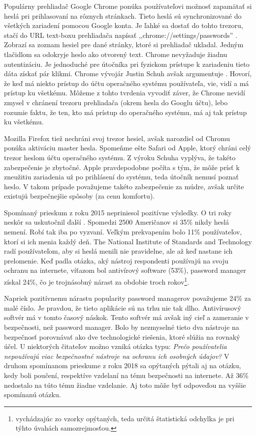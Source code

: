 Populárny prehliadač Google Chrome ponúka používateľovi možnosť zapamätať si heslá pri prihlasovaní na rôznych stránkach. Tieto heslá sú synchronizované do všetkých zariadení pomocou Google konta. Je ľahké sa dostať do tohto trezoru, stačí do URL text-boxu prehliadača napísať ,,chrome://settings/passwords'' \cite{chrome_passw}. Zobrazí sa zoznam hesiel pre dané stránky, ktoré si prehliadač ukladal. Jedným tlačidlom sa odokryje heslo ako otvorený text. Chrome nevyžaduje žiadnu autentizáciu. Je jednoduché pre útočníka pri fyzickom prístupe k zariadeniu tieto dáta získať pár klikmi. Chrome vývojár Justin Schuh avšak argumentuje \cite{chrome_passw}. Hovorí, že keď má niekto prístup do účtu operačného systému používateľa, vie, vidí a má prístup ku všetkému. Môžeme z tohto tvrdenia vyvodiť záver, že Chrome nevidí zmysel v chránení trezoru prehliadača (okrem hesla do Googlu účtu), lebo rozumie faktu, že ten, kto má prístup do operačného systému, má aj tak prístup ku všetkému.

Mozilla Firefox tiež nechráni svoj trezor hesiel, avšak narozdiel od Chromu ponúka aktiváciu master hesla. Spomeňme ešte Safari od Apple, ktorý chráni celý trezor heslom účtu operačného systému. Z výroku Schuha vyplýva, že takéto zabezpečenie je zbytočné. Apple pravdepodobne počíta s tým, že môže prísť k zneužitiu zariadenia už po prihlásení do systému, teda útočník nemusí poznať heslo. V takom prípade považujeme takéto zabezpečenie za múdre, avšak určite existujú bezpečnejšie spôsoby (za cenu komfortu).

Spomínaný prieskum z roku 2015 nepriniesol pozitívne výsledky. O tri roky neskôr sa uskutočnil ďalší \cite{survey2}. Spomedzi 2500 Američanov si 35\% nikdy heslá nemení. Robí tak iba po vyzvaní. Veľkým prekvapením bolo 11\% používateľov, ktorí si ich menia každý deň. The National Institute of Standards and Technology radí používateľom, aby si heslá menili nie pravidelne, ale až keď nastane ich prelomenie. Keď padla otázka, aký nástroj respondenti používajú na svoju ochranu na internete, víťazom bol antivírový software (53\%), password manager získal 24\%, čo je trojnásobný nárast za obdobie troch rokov\footnote{vychádzajúc zo vzorky opýtaných, teda určitá štatistická odchylka je pri týhto úvahách samozrejmosťou.}.

Napriek pozitívnemu nárastu popularity password managerov považujeme 24\% za malé číslo. Je pravdou, že tieto aplikácie sú na trhu nie tak dlho. Antivírusový softvér má v tomto časový náskok. Tento softvér má avšak iný cieľ a zameranie v bezpečnosti, než password manager. Bolo by nezmyselné tieto dva nástroje na bezpečnosť porovnávať ako dve technologické riešenia, ktoré slúžia na rovnaký účel. U niektorých čitateľov možno vzniká otázka typu: \textit{Prečo používatelia nepoužívajú viac bezpečnostné nástroje na ochranu ich osobných údajov?} V druhom spomínanom prieskume z roku 2018 sa opýtaných pýtali aj na otázku, kedy boli poučení, respektíve vzdelaní na tému bezpečnosti na internete. Až 36\% nedostalo na túto tému žiadne vzdelanie. Aj toto môže byť odpoveďou na vyššie spomínanú otázku.

